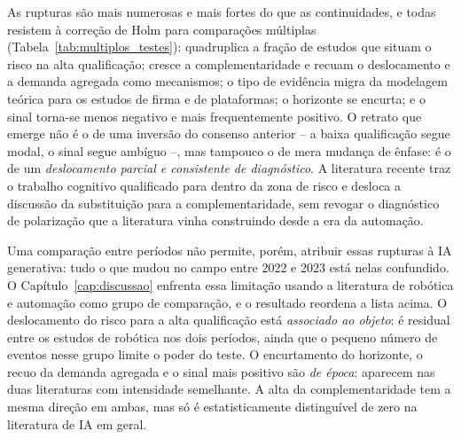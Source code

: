 As rupturas são mais numerosas e mais fortes do que as continuidades, e todas resistem à correção de Holm para comparações múltiplas (Tabela~\ref{tab:multiplos_testes}): quadruplica a fração de estudos que situam o risco na alta qualificação; cresce a complementaridade e recuam o deslocamento e a demanda agregada como mecanismos; o tipo de evidência migra da modelagem teórica para os estudos de firma e de plataformas; o horizonte se encurta; e o sinal torna-se menos negativo e mais frequentemente positivo. O retrato que emerge não é o de uma inversão do consenso anterior -- a baixa qualificação segue modal, o sinal segue ambíguo --, mas tampouco o de mera mudança de ênfase: é o de um \emph{deslocamento parcial e consistente de diagnóstico}. A literatura recente traz o trabalho cognitivo qualificado para dentro da zona de risco e desloca a discussão da substituição para a complementaridade, sem revogar o diagnóstico de polarização que a literatura vinha construindo desde a era da automação.

Uma comparação entre períodos não permite, porém, atribuir essas rupturas à IA generativa: tudo o que mudou no campo entre 2022 e 2023 está nelas confundido. O Capítulo~\ref{cap:discussao} enfrenta essa limitação usando a literatura de robótica e automação como grupo de comparação, e o resultado reordena a lista acima. O deslocamento do risco para a alta qualificação está \emph{associado ao objeto}: é residual entre os estudos de robótica nos dois períodos, ainda que o pequeno número de eventos nesse grupo limite o poder do teste. O encurtamento do horizonte, o recuo da demanda agregada e o sinal mais positivo são \emph{de época}: aparecem nas duas literaturas com intensidade semelhante. A alta da complementaridade tem a mesma direção em ambas, mas só é estatisticamente distinguível de zero na literatura de IA em geral.
